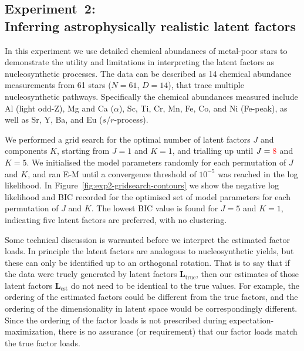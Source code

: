 \documentclass[twocolumn]{aastex62}
\newcommand{\todo}[1]{\textcolor{red}{#1}}
\newcommand{\factorloads}{\textbf{L}}
\newcommand{\NumData}{N}
\newcommand{\NumDimensions}{D}
\newcommand{\NumLatentFactors}{J}
\newcommand{\NumComponents}{K}
\begin{document}
\subsection{Experiment~2:\\Inferring astrophysically realistic latent factors}

In this experiment we use detailed chemical abundances of metal-poor stars 
\citep{Barklem:2005} to demonstrate the utility and limitations
in interpreting the latent factors as nucleosynthetic processes. The data 
can be described as 14 chemical abundance measurements from 61 stars ($\NumData = 61$, $\NumDimensions = 14$), that trace multiple nucleosynthetic pathways. Specifically the chemical
abundances measured include Al (light odd-Z), Mg and Ca ($\alpha$), Sc, Ti, Cr, Mn, Fe, Co, and Ni (Fe-peak), as well as Sr, Y, Ba, and Eu ($s$/$r$-process). 

We performed a grid search for the optimal number of latent factors $\NumLatentFactors$ and 
components $\NumComponents$, starting from $\NumLatentFactors = 1$ and $K = 1$, and trialling up until $\NumLatentFactors = \todo{8}$ and $\NumComponents = 5$. We initialised
the model parameters randomly for each permutation of $J$ and $K$, and ran E-M
until a convergence threshold of $10^{-5}$ was reached in the log likelihood. 
In Figure~\ref{fig:exp2-gridsearch-contours} we show the negative log likelihood 
and BIC recorded for the optimised set of model parameters for each permutation 
of $J$ and $K$. The lowest BIC value is found for $J = 5$ and $K = 1$, indicating
five latent factors are preferred, with no clustering.

Some technical discussion is warranted before we interpret the estimated factor loads.
In principle the latent factors are analogous to nucleosynthetic yields, but 
these can only be identified up to an orthogonal rotation. That is to say that
if the data were truely generated by latent factors $\factorloads_\textrm{true}$,
then our estimates of those latent factors $\factorloads_\textrm{est}$ do not need
to be identical to the true values. For example, the ordering of the estimated factors
could be different from the true factors, and the ordering of the dimensionality
in latent space would be correspondingly different. Since the ordering of the 
factor loads is not prescribed during expectation-maximization, there is no 
assurance (or requirement) that our factor loads match the true factor loads.
\end{document}
